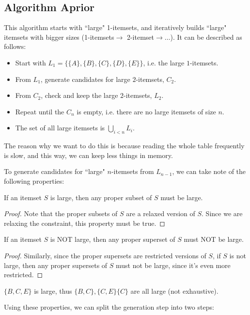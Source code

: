 \documentclass[../main/main.tex]{subfiles}
\begin{document}
	\subsection{Algorithm Aprior}
	This algorithm starts with ``large" 1-itemsets, and iteratively builds ``large" itemsets with bigger sizes (1-itemsets$\to$ 2-itemset$\to\ldots$). It can be described as follows:
	\begin{itemize}
		\item Start with $L_1=\{\{A\} ,\{B\} ,\{C\} ,\{D\} ,\{E\} \} $, i.e. the large $1$-itemsets.
		\item From $L_1$, generate candidates for large $2$-itemsets, $C_2$.
		\item From $C_2$, check and keep the large $2$-itemsets, $L_2$.
		\item Repeat until the $C_n$ is empty, i.e. there are no large itemsets of size $n$.
		\item The set of all large itemsets is $\bigcup\limits_{i<n}L_i $.
	\end{itemize}
	\begin{remark}
		The reason why we want to do this is because reading the whole table frequently is slow, and this way, we can keep less things in memory.
	\end{remark}
	To generate candidates for ``large" $n$-itemsets from $L_{n-1}$, we can take note of the following properties:
	\begin{theorem}\label{largesubsets}
		If an itemset $S$ is large, then any proper subset of $S$ must be large.
	\end{theorem}
	\begin{proof}
		Note that the proper subsets of $S$ are a relaxed version of $S$. Since we are relaxing the constraint, this property must be true.
	\end{proof}
\begin{theorem}
	If an itemset $S$ is NOT large, then any proper superset of $S$ must NOT be large.
\end{theorem}
\begin{proof}
	Similarly, since the proper supersets are restricted versions of $S$, if $S$ is not large, then any proper supersets of $S$ must not be large, since it's even more restricted.
\end{proof}
\begin{example}
	$\{B,C,E\} $ is large, thus $\{B,C\} ,\{C,E\} \{C\} $ are all large (not exhaustive).
\end{example}
	Using these properties, we can split the generation step into two steps: 
	
\end{document}
